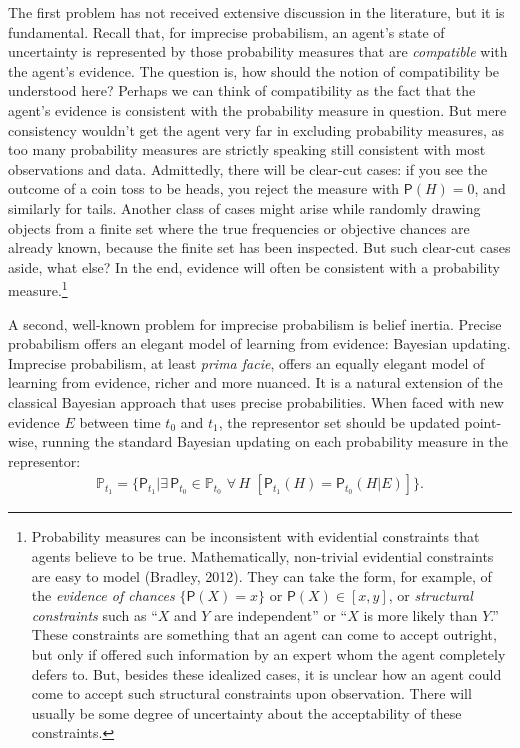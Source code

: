 \documentclass[
  letterpaper,
  DIV=11,
  numbers=noendperiod]{scrartcl}
\begin{document}
The first problem has not received extensive discussion in the
literature, but it is fundamental. Recall that, for imprecise
probabilism, an agent's state of uncertainty is represented by those
probability measures that are \emph{compatible} with the agent's
evidence. The question is, how should the notion of compatibility be
understood here? Perhaps we can think of compatibility as the fact that
the agent's evidence is consistent with the probability measure in
question. But mere consistency wouldn't get the agent very far in
excluding probability measures, as too many probability measures are
strictly speaking still consistent with most observations and data.
Admittedly, there will be clear-cut cases: if you see the outcome of a
coin toss to be heads, you reject the measure with \(\mathsf{P}(H)=0\),
and similarly for tails. Another class of cases might arise while
randomly drawing objects from a finite set where the true frequencies or
objective chances are already known, because the finite set has been
inspected. But such clear-cut cases aside, what else? In the end,
evidence will often be consistent with a probability measure.\footnote{Probability
  measures can be inconsistent with evidential constraints that agents
  believe to be true. Mathematically, non-trivial evidential constraints
  are easy to model (Bradley, 2012). They can take the form, for
  example, of the \emph{evidence of chances} \(\{ \mathsf{P}(X) = x\}\)
  or \(\mathsf{P}(X) \in [x,y]\), or \emph{structural constraints} such
  as ``\(X\) and \(Y\) are independent'' or ``\(X\) is more likely than
  \(Y\).'' These constraints are something that an agent can come to
  accept outright, but only if offered such information by an expert
  whom the agent completely defers to. But, besides these idealized
  cases, it is unclear how an agent could come to accept such structural
  constraints upon observation. There will usually be some degree of
  uncertainty about the acceptability of these constraints.}

A second, well-known problem for imprecise probabilism is belief
inertia. Precise probabilism offers an elegant model of learning from
evidence: Bayesian updating. Imprecise probabilism, at least
\emph{prima facie}, offers an equally elegant model of learning from
evidence, richer and more nuanced. It is a natural extension of the
classical Bayesian approach that uses precise probabilities. When faced
with new evidence \(E\) between time \(t_0\) and \(t_1\), the
representor set should be updated point-wise, running the standard
Bayesian updating on each probability measure in the representor:
\begin{align*} \label{eq:updateRepresentor}
\mathbb{P}_{t_1} = \{\mathsf{P}_{t_1}\vert \exists\, {\mathsf{P}_{t_0} \!\in  \mathbb{P}_{t_0}}\,\, \forall\, {H}\,\, \left[\mathsf{P}_{t_1}(H)=\mathsf{P}_{t_0}(H \vert E)\right] \}.
\end{align*}
\end{document}
